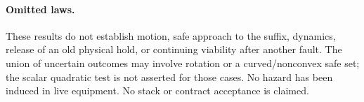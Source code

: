 \documentclass[11pt]{article}
\begin{document}
\paragraph{Omitted laws.}
These results do not establish motion, safe approach to the suffix,
dynamics, release of an old physical hold, or continuing viability
after another fault. The union of uncertain outcomes may involve
rotation or a curved/nonconvex safe set; the scalar quadratic test is
not asserted for those cases. No hazard has been induced in live
equipment. No stack or contract acceptance is claimed.
\end{document}

